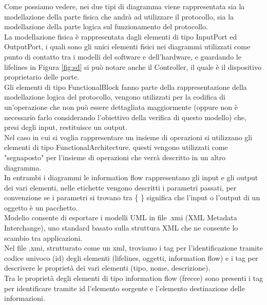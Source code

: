 \noindent Come possiamo vedere, nei due tipi di diagramma viene rappresentata sia la modellazione della parte fisica che andrà ad utilizzare il protocollo, sia la modellazione della parte logica sul funzionamento del protocollo.\\
La modellazione fisica è rappresentata dagli elementi di tipo InputPort ed OutputPort, i quali sono gli unici elementi fisici nei diagrammi utilizzati come punto di contatto tra i modelli del software e dell'hardware, e guardando le lifelines in Figura \ref*{fig:sd} si può notare anche il Controller, il quale è il dispositivo proprietario delle porte.\\
Gli elementi di tipo FunctionalBlock fanno parte della rappresentazione della modellazione logica del protocollo, vengono utilizzati per la codifica di un'operazione che non può essere dettagliata maggiormente (oppure non è necessario farlo considerando l'obiettivo della verifica di questo modello) che, presi degli input, restituisce un output.\\
Nel caso in cui si voglia rappresentare un insieme di operazioni si utilizzano gli elementi di tipo FunctionalArchitecture, questi vengono utilizzati come "segnaposto" per l'insieme di operazioni che verrà descritto in un altro diagramma.\\  
In entrambi i diagrammi le information flow rappresentano gli input e gli output dei vari elementi, nelle etichette vengono descritti i parametri passati, per convenzione se i parametri si trovano tra \{ \} significa che l'input o l'output di un oggetto è un pacchetto.\\
Modelio consente di esportare i modelli UML in file .xmi (XML Metadata Interchange), uno standard basato sulla struttura XML che ne consente lo scambio tra applicazioni.\\
Nel file .xmi, strutturato come un xml, troviamo i tag per l'identificazione tramite codice univoco (id) degli elementi (lifelines, oggetti, information flow) e i tag per descrivere le proprietà dei vari elementi (tipo, nome, descrizione).\\
Tra le proprietà degli elementi di tipo information flow (frecce) sono presenti i tag per identificare tramite id l'elemento sorgente e l'elemento destinazione delle informazioni.\\
